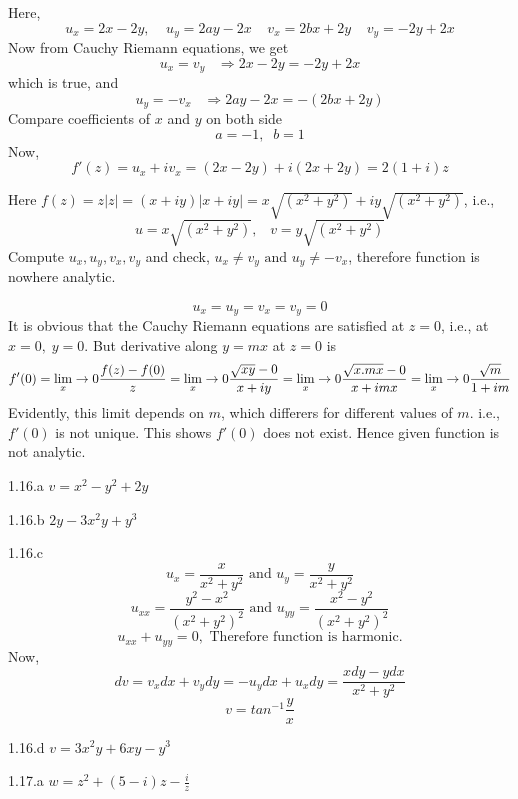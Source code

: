 \begin{Solution}{1.11}
Here,
\[u_x=2x-2y,\;\;\;\;u_y=2ay-2x\;\;\;\;v_x=2bx+2y\;\;\;\;v_y=-2y+2x\]
Now from Cauchy Riemann equations, we get
\[u_x=v_y\;\;\;\Rightarrow 2x-2y=-2y+2x\]
which is true, and
\[u_y=-v_x\;\;\;\Rightarrow 2ay-2x=-(2bx+2y)\]
Compare coefficients of $x$ and $y$ on both side
\[a=-1,\;\;b=1\]
Now,
\[f'(z)=u_x+iv_x = (2x-2y)+i(2x+2y) = 2(1+i)z\]
\end{Solution}
\begin{Solution}{1.12}
Here $f(z)=z|z| = (x+iy)|x+iy| = x\sqrt{(x^2+y^2)}+iy\sqrt{(x^2+y^2)}$, i.e.,
\[u=x\sqrt{(x^2+y^2)},\;\;\;v=y\sqrt{(x^2+y^2)}\]
Compute $u_x,u_y,v_x,v_y$ and check, $u_x\neq v_y \text{ and } u_y \neq -v_x$, therefore function is nowhere analytic.
\end{Solution}
\begin{Solution}{1.15}
\[u_x=u_y=v_x=v_y =0\]
It is obvious that the Cauchy Riemann equations are satisfied at $z=0$, i.e., at $x=0,\;y=0$.
But derivative along $y=mx$ at $z=0$ is
\[f'(0)=\lim_x\rightarrow 0 \frac{f(z)-f(0)}{z}=\lim_x\rightarrow 0 \frac{\sqrt{xy}-0}{x+iy} = \lim_x\rightarrow 0 \frac{\sqrt{x.mx}-0}{x+imx} = \lim_x\rightarrow 0 \frac{\sqrt{m}}{1+im} \]
Evidently, this limit depends on $m$, which differers for different values of $m$. i.e., $f'(0)$ is not unique. This shows $f'(0)$ does not exist. Hence given function is not analytic.
\end{Solution}
\begin{Solution}{1.16.a}
	$v=x^2-y^2+2y$
	
\end{Solution}
\begin{Solution}{1.16.b}
	$2y-3x^2y+y^3$
	
\end{Solution}
\begin{Solution}{1.16.c}
	\[u_x=\frac{x}{x^2+y^2} \text{ and }u_y=\frac{y}{x^2+y^2} \]
	\[u_{xx}=\frac{y^2-x^2}{(x^2+y^2)^2} \text{ and }u_{yy}=\frac{x^2-y^2}{(x^2+y^2)^2} \]
	\[u_{xx}+u_{yy} = 0 , \text{ Therefore function is harmonic.}\]
	Now,
	\[dv=v_xdx + v_ydy = -u_ydx + u_xdy = \frac{xdy-ydx}{x^2+y^2} \]
	\[v=tan^{-1} \frac{y}{x}\]
	
\end{Solution}
\begin{Solution}{1.16.d}
	$v=3x^2y + 6xy - y^3$
	
\end{Solution}
\begin{Solution}{1.17.a}
	$w=z^{2}+(5-i)z-\frac{i}{z}$
	
\end{Solution}
